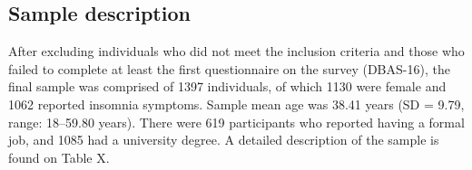 \documentclass[
  ,doc,11pt, twoside,floatsintext]{apa6}
\begin{document}
\hypertarget{sample-description}{%
\subsection{Sample description}\label{sample-description}}

After excluding individuals who did not meet the inclusion criteria and those who failed to complete at least the first questionnaire on the survey (DBAS-16), the final sample was comprised of 1397 individuals, of which 1130 were female and 1062 reported insomnia symptoms. Sample mean age was 38.41 years (SD = 9.79, range: 18--59.80 years). There were 619 participants who reported having a formal job, and 1085 had a university degree. A detailed description of the sample is found on Table X.

\begin{table}


\end{table}
\end{document}
